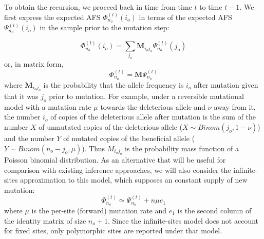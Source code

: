 \documentclass[9pt,twocolumn,twoside,lineno]{gsajnl}
\newcommand{\afs}[2]{\Phi_{#1}^{(#2)}}
\newcommand{\afsPsi}[2]{\Psi_{#1}^{(#2)}}
\begin{document}
To obtain the recursion, we proceed back in time from time $t$ to time $t-1$.  We first express the expected AFS $\afs{n_o}{t}(i_o)$ in terms of the expected AFS $\afsPsi{n_o}{t}(i_o)$ in the sample prior to the mutation step:   

\begin{equation}
  \afs{n_o}{t}(i_o)=  \sum_{j_o} \mathbf{M}_{i_oj_o} \afsPsi{n_o}{t}(j_o) 
  \label{mut}
\end{equation}
or, in matrix form, 
\begin{equation}
  \afs{n_o}{t}= \mathbf{M} \afsPsi{n_o}{t}
  \label{mut}
\end{equation}
where $\mathbf{M}_{i_oj_o}$ is the probability that the allele frequency is $i_o$ after mutation given that it was $j_o$ prior to mutation. For example, under a reversible mutational model with a mutation rate $\mu$ towards the deleterious allele and $\nu$ away from it, the number $i_o$ of copies of the deleterious allele after mutation is the sum of the number $X$ of unmutated copies of the deleterious allele ($X \sim \mathit{Binom}(j_o, 1-\nu)$)  and the number $Y$ of mutated copies of the beneficial allele  ($Y \sim \mathit{Binom}(n_o-j_o, \mu)$). Thus $M_{i_oj_o}$ is the probability mass function of a Poisson binomial distribution. As an alternative that will be useful for comparison with existing inference approaches, we will also consider the infinite-sites approximation to this model, which supposes an constant supply of new mutation:  
\begin{equation}
  \afs{n_o}{t} \simeq  \afsPsi{n_o}{t} + n \mu e_1
\end{equation}
where $\mu$ is the per-site (forward) mutation rate and $e_1$ is the second column of the identity
matrix of size $n_o+1.$ Since the infinite-sites model does not account for fixed sites,
only polymorphic sites are reported under that model. 


%
%
\end{document}

